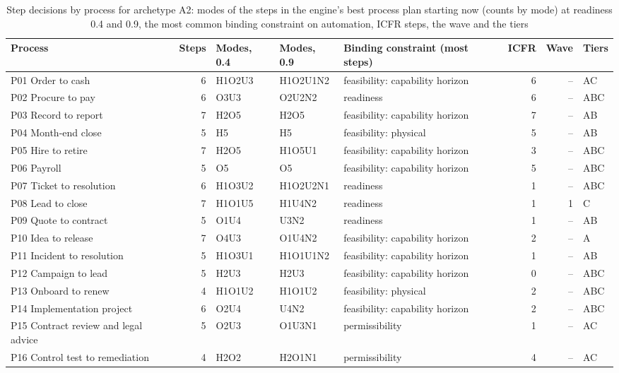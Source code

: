\begin{table}[p]
\centering
\caption{Step decisions by process for archetype A2: modes of the steps in the engine's best process plan starting now (counts by mode) at readiness 0.4 and 0.9, the most common binding constraint on automation, ICFR steps, the wave and the tiers}\label{tab:playbook-processes}
\scriptsize
\setlength{\tabcolsep}{3pt}
\begin{tabular}{@{}p{4.0cm}rllp{4.0cm}rrl@{}}
\toprule
Process & Steps & Modes, 0.4 & Modes, 0.9 & Binding constraint (most steps) & ICFR & Wave & Tiers\\
\midrule
P01 Order to cash & 6 & H1O2U3 & H1O2U1N2 & feasibility: capability horizon & 6 & -- & AC \\
P02 Procure to pay & 6 & O3U3 & O2U2N2 & readiness & 6 & -- & ABC \\
P03 Record to report & 7 & H2O5 & H2O5 & feasibility: capability horizon & 7 & -- & AB \\
P04 Month-end close & 5 & H5 & H5 & feasibility: physical & 5 & -- & AB \\
P05 Hire to retire & 7 & H2O5 & H1O5U1 & feasibility: capability horizon & 3 & -- & ABC \\
P06 Payroll & 5 & O5 & O5 & feasibility: capability horizon & 5 & -- & ABC \\
P07 Ticket to resolution & 6 & H1O3U2 & H1O2U2N1 & readiness & 1 & -- & ABC \\
P08 Lead to close & 7 & H1O1U5 & H1U4N2 & readiness & 1 & 1 & C \\
P09 Quote to contract & 5 & O1U4 & U3N2 & readiness & 1 & -- & AB \\
P10 Idea to release & 7 & O4U3 & O1U4N2 & feasibility: capability horizon & 2 & -- & A \\
P11 Incident to resolution & 5 & H1O3U1 & H1O1U1N2 & feasibility: capability horizon & 1 & -- & AB \\
P12 Campaign to lead & 5 & H2U3 & H2U3 & feasibility: capability horizon & 0 & -- & ABC \\
P13 Onboard to renew & 4 & H1O1U2 & H1O1U2 & feasibility: physical & 2 & -- & ABC \\
P14 Implementation project & 6 & O2U4 & U4N2 & feasibility: capability horizon & 2 & -- & ABC \\
P15 Contract review and legal advice & 5 & O2U3 & O1U3N1 & permissibility & 1 & -- & AC \\
P16 Control test to remediation & 4 & H2O2 & H2O1N1 & permissibility & 4 & -- & AC \\

\end{tabular}
\end{table}
